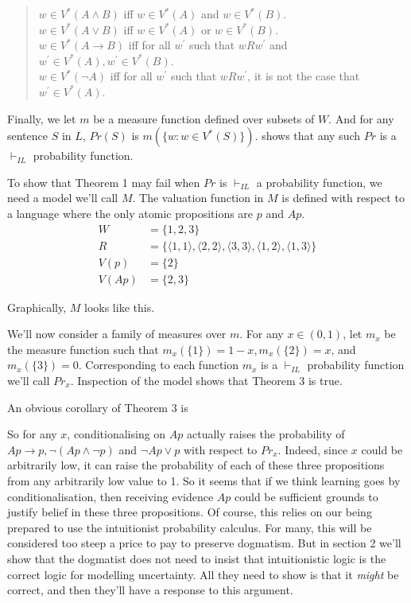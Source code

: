 \begin{quote}
$w \in V^*(A \wedge B)$ iff $w \in V^*(A)$ and $w \in V^*(B)$. \\
$w \in V^*(A \vee B)$ iff $w \in V^*(A)$ or $w \in V^*(B)$.\\
$w \in V^*(A \rightarrow B)$ iff for all $w^{\prime}$ such that $wRw^{\prime}$ and $w^{\prime}\in V^*(A), w^{\prime} \in V^*(B)$.\\
$w \in V^*(\neg A)$ iff for all $w^{\prime}$ such that $wRw^{\prime}$, it is not the case that $w^{\prime} \in V^*(A)$.
\end{quote}

\noindent Finally, we let $m$ be a measure function defined over subsets of $W$. And for any sentence $S$ in $L$, $Pr(S)$ is $m(\{w: w \in V^*(S)\})$. \citet{Weatherson2003} shows that any such $Pr$ is a $\vdash_{IL}$ probability function.

To show that Theorem 1 may fail when $Pr$ is $\vdash_{IL}$ a probability function, we need a model we'll call $M$. The valuation function in $M$ is defined with respect to a language where the only atomic propositions are $p$ and $Ap$.
\begin{align}
W &= \{1, 2, 3\} \\
R &=  \{\langle 1, 1\rangle , \langle 2, 2\rangle , \langle 3, 3\rangle , \langle 1, 2\rangle , \langle 1, 3\rangle \} \\
V(p) &= \{2\} \\
V(Ap) &= \{2, 3\}
\end{align}

\noindent Graphically, $M$ looks like this.

\ModelPicture

\noindent We'll now consider a family of measures over $m$. For any $x \in (0, 1)$, let $m_x$ be the measure function such that $m_x(\{1\}) = 1 - x, m_x(\{2\}) = x$, and $m_x(\{3\}) = 0$. Corresponding to each function $m_x$ is a $\vdash_{IL}$ probability function we'll call $Pr_x$.  Inspection of the model shows that Theorem 3 is true.

\TheoremThree

\noindent An obvious corollary of Theorem 3 is 

\TheoremFour

\noindent So for any $x$, conditionalising on $Ap$ actually raises the probability of $Ap \rightarrow p, \neg(Ap \wedge \neg p)$ and $\neg Ap \vee p$ with respect to $Pr_x$. Indeed, since $x$ could be arbitrarily low, it can raise the probability of each of these three propositions from any arbitrarily low value to 1. So it seems that if we think learning goes by conditionalisation, then receiving evidence $Ap$ could be sufficient grounds to justify belief in these three propositions. Of course, this relies on our being prepared to use the intuitionist probability calculus. For many, this will be considered too steep a price to pay to preserve dogmatism. But in section 2 we'll show that the dogmatist does not need to insist that intuitionistic logic is the correct logic for modelling uncertainty. All they need to show is that it \textit{might} be correct, and then they'll have a response to this argument.

